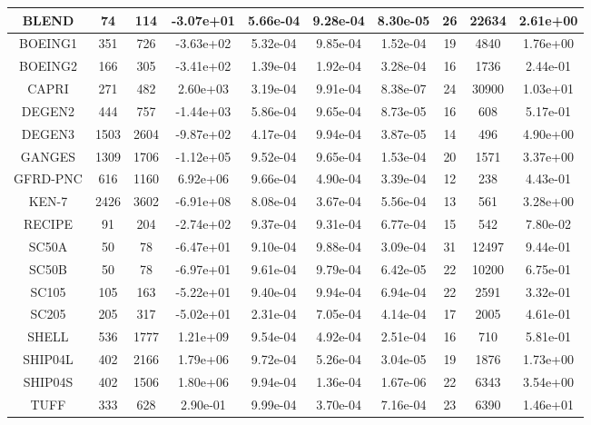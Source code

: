 \documentclass{article}
\begin{document}
\begin{table}
{{\begin{tabular}{cccccccccc}
                BLEND    & 74   & 114  & -3.07e+01 & 5.66e-04 & 9.28e-04 & 8.30e-05 & 26      & 22634 & 2.61e+00 \\ \hline
                BOEING1  & 351  & 726  & -3.63e+02 & 5.32e-04 & 9.85e-04 & 1.52e-04 & 19      & 4840  & 1.76e+00 \\ \hline
                BOEING2  & 166  & 305  & -3.41e+02 & 1.39e-04 & 1.92e-04 & 3.28e-04 & 16      & 1736  & 2.44e-01 \\ \hline
                CAPRI    & 271  & 482  & 2.60e+03  & 3.19e-04 & 9.91e-04 & 8.38e-07 & 24      & 30900 & 1.03e+01 \\ \hline
                DEGEN2   & 444  & 757  & -1.44e+03 & 5.86e-04 & 9.65e-04 & 8.73e-05 & 16      & 608   & 5.17e-01 \\ \hline
                DEGEN3   & 1503 & 2604 & -9.87e+02 & 4.17e-04 & 9.94e-04 & 3.87e-05 & 14      & 496   & 4.90e+00 \\ \hline
                GANGES   & 1309 & 1706 & -1.12e+05 & 9.52e-04 & 9.65e-04 & 1.53e-04 & 20      & 1571  & 3.37e+00 \\ \hline
                GFRD-PNC & 616  & 1160 & 6.92e+06  & 9.66e-04 & 4.90e-04 & 3.39e-04 & 12      & 238   & 4.43e-01 \\ \hline
                KEN-7    & 2426 & 3602 & -6.91e+08 & 8.08e-04 & 3.67e-04 & 5.56e-04 & 13      & 561   & 3.28e+00 \\ \hline
                RECIPE   & 91   & 204  & -2.74e+02 & 9.37e-04 & 9.31e-04 & 6.77e-04 & 15      & 542   & 7.80e-02 \\ \hline
                SC50A    & 50   & 78   & -6.47e+01 & 9.10e-04 & 9.88e-04 & 3.09e-04 & 31      & 12497 & 9.44e-01 \\ \hline
                SC50B    & 50   & 78   & -6.97e+01 & 9.61e-04 & 9.79e-04 & 6.42e-05 & 22      & 10200 & 6.75e-01 \\ \hline
                SC105    & 105  & 163  & -5.22e+01 & 9.40e-04 & 9.94e-04 & 6.94e-04 & 22      & 2591  & 3.32e-01 \\ \hline
                SC205    & 205  & 317  & -5.02e+01 & 2.31e-04 & 7.05e-04 & 4.14e-04 & 17      & 2005  & 4.61e-01 \\ \hline
                SHELL    & 536  & 1777 & 1.21e+09  & 9.54e-04 & 4.92e-04 & 2.51e-04 & 16      & 710   & 5.81e-01 \\ \hline
                SHIP04L  & 402  & 2166 & 1.79e+06  & 9.72e-04 & 5.26e-04 & 3.04e-05 & 19      & 1876  & 1.73e+00 \\ \hline
                SHIP04S  & 402  & 1506 & 1.80e+06  & 9.94e-04 & 1.36e-04 & 1.67e-06 & 22      & 6343  & 3.54e+00 \\ \hline
                TUFF     & 333  & 628  & 2.90e-01  & 9.99e-04 & 3.70e-04 & 7.16e-04 & 23      & 6390  & 1.46e+01 \\ \hline
            \end{tabular}
        }
    }
\end{table}
\end{document}
